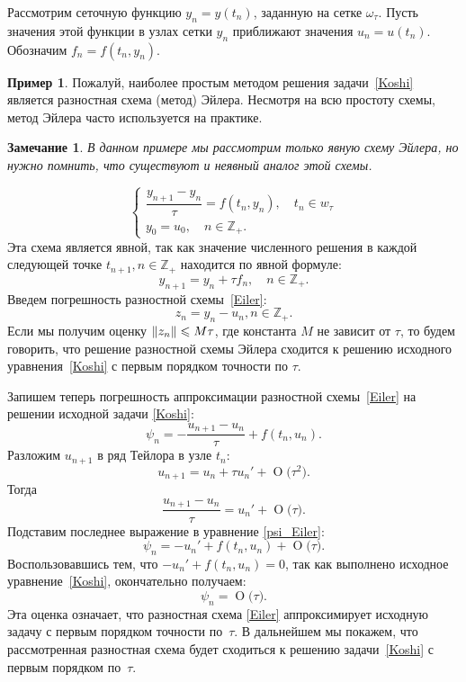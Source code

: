 \documentclass[11pt,a4paper,twoside]{report}
\numberwithin{equation}{section}
\theoremstyle{definition}
\newtheorem{example}{Пример}[section]
\theoremstyle{plain}
\newtheorem*{note*}{Замечание}
\DeclarePairedDelimiter\norm{\lVert}{\rVert}
\newcommand{\bigO}[1]{\ensuremath{\operatorname{O}\bigl(#1\bigr)}}
\begin{document}
Рассмотрим сеточную функцию $y_n = y(t_n)$, заданную
на сетке $\omega_\tau$. Пусть значения этой функции в узлах сетки $y_n$ приближают
значения $u_n=u(t_n)$. Обозначим $f_n=f(t_n,y_n)$.
\fi
%
\begin{example}
    Пожалуй, наиболее простым методом решения задачи~\eqref{Koshi} является
    разностная схема (метод) Эйлера. Несмотря на всю простоту схемы, метод Эйлера часто
    используется на практике.
    \begin{note*}
        В данном примере мы рассмотрим только явную схему Эйлера, но нужно
        помнить, что существуют и неявный аналог этой схемы.
    \end{note*}
    \begin{equation}
        \label{Eiler}
        \begin{cases}
            \dfrac{y_{n+1} - y_n}{\tau} = f(t_n, y_n), \quad t_n \in w_{\tau} \\
            y_0 = u_0, \quad n \in \mathbb{Z}_+.
        \end{cases}
    \end{equation}
    Эта схема является явной, так как значение численного решения в каждой
    следующей точке $t_{n+1}, n\in\mathbb{Z}_+$ находится по явной формуле:
    $$
        y_{n+1} = y_n + \tau f_n, \quad n \in \mathbb{Z}_+.
    $$
    Введем погрешность разностной схемы~\eqref{Eiler}:
    $$
        z_n = y_n - u_n,   n\in\mathbb{Z}_+.
    $$
    Если мы получим оценку $\norm{z_n} \leqslant M\tau$, где константа $M$ не зависит от $\tau$,
    то будем говорить, что решение разностной схемы Эйлера сходится к решению исходного
    уравнения~\eqref{Koshi} с первым порядком точности по $\tau$.

    Запишем теперь погрешность аппроксимации разностной схемы~\eqref{Eiler} на решении исходной
    задачи \eqref{Koshi}:
    \begin{equation}
        \label{psi_Eiler}
        \psi_n = - \frac{u_{n+1} - u_n}{\tau} + f(t_n, u_n).
    \end{equation}
    Разложим $u_{n+1}$ в ряд Тейлора в узле $t_n$:
    $$
        u_{n+1} = u_n + \tau u_n' + \bigO{\tau^2}.
    $$
    Тогда
    $$
        \frac{u_{n+1} - u_n}{\tau} = u_n' + \bigO{\tau}.
    $$
    Подставим последнее выражение в уравнение \eqref{psi_Eiler}:
    $$
        \psi_n = -u_n' + f(t_n, u_n) + \bigO{\tau}.
    $$
    Воспользовавшись тем, что $-u_n' + f(t_n, u_n) = 0$, так как выполнено
    исходное уравнение~\eqref{Koshi}, окончательно получаем:
    $$
        \psi_n = \bigO{\tau}.
    $$
    Эта оценка означает, что разностная схема \eqref{Eiler} аппроксимирует исходную задачу с первым порядком точности по~$\tau$. В дальнейшем мы покажем, что
    рассмотренная разностная схема будет сходиться к решению задачи~\eqref{Koshi}
    с первым порядком по~$\tau$.
\end{example}
\end{document}
